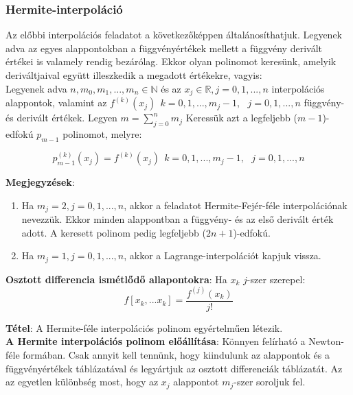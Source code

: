 \documentclass[margin=0px]{article}
\begin{document}
\subsubsection{Hermite-interpoláció}
Az előbbi interpolációs feladatot a következőképpen általánosíthatjuk. Legyenek adva az egyes alappontokban a függvényértékek
mellett a függvény derivált értékei is valamely rendig bezárólag. Ekkor olyan polinomot keresünk, amelyik deriváltjaival együtt
illeszkedik a megadott értékekre, vagyis:\\

\noindent Legyenek adva $n,m_{0},m_{1},..., m_{n} \in \mathbb{N}$ és az $x_{j} \in \mathbb{R}, j=0,1,...,n$ interpolációs
alappontok, valamint az $f^{(k)}(x_{j}) \ \ k=0,1,...,m_{j}-1, \ \ \ j=0,1,...,n$ függvény- és derivált értékek. Legyen
$m = \displaystyle\sum_{j=0}^{n}m_{j}$ Keressük azt a legfeljebb ($m-1$)-edfokú $p_{m-1}$ polinomot, melyre:

\begin{displaymath}
    p^{(k)}_{m-1}(x_{j}) = f^{(k)}(x_{j}) \ \ k=0,1,...,m_{j}-1, \ \ \ j=0,1,...,n
\end{displaymath}

\noindent \textbf{Megjegyzések}:
\begin{enumerate}
    \item	Ha $m_{j}=2, j=0,1,...,n$, akkor a feladatot Hermite-Fejér-féle interpolációnak nevezzük. Ekkor minden alappontban
          a függvény- és az első derivált érték adott. A keresett polinom pedig legfeljebb ($2n+1$)-edfokú.

    \item	Ha $m_{j}=1, j=0,1,...,n$, akkor a Lagrange-interpolációt kapjuk vissza.
\end{enumerate}

\noindent \textbf{Osztott differencia ismétlődő allapontokra}: Ha $x_{k}$ $j$-szer szerepel:
\begin{displaymath}
    f[x_{k}, ... x_{k}] = \frac{f^{(j)}(x_{k})}{j!}
\end{displaymath}

\noindent \textbf{Tétel}: A Hermite-féle interpolációs polinom egyértelműen létezik.\\

\noindent \textbf{A Hermite interpolációs polinom előállítása}: Könnyen felírható a Newton-féle formában. Csak annyit
kell tennünk, hogy kiindulunk az alappontok és a függvényértékek táblázatával és legyártjuk az osztott differenciák
táblázatát. Az az egyetlen különbség most, hogy az $x_{j}$ alappontot $m_{j}$-szer soroljuk fel.\\
\end{document}
